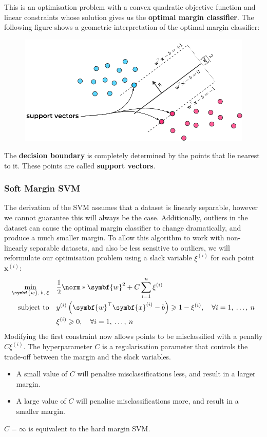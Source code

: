 \documentclass{article}
\begin{document}
This is an optimisation problem with a convex quadratic objective
function and linear constraints whose solution gives us the
\textbf{optimal margin classifier}. The following figure shows a
geometric interpretation of the optimal margin classifier:
\begin{figure}[H]
    \centering
    \includegraphics[width = \linewidth]{figures/hard_margin_svm.pdf}
\end{figure}
The \textbf{decision boundary} is completely determined by the points
that lie nearest to it. These points are called \textbf{support vectors}.
\subsubsection{Soft Margin SVM}
The derivation of the SVM assumes that a dataset is linearly separable,
however we cannot guarantee this will always be the case. Additionally,
outliers in the dataset can cause the optimal margin classifier to
change dramatically, and produce a much smaller margin. To allow this
algorithm to work with non-linearly separable datasets, and also be
less sensitive to outliers, we will reformulate our optimisation
problem using a slack variable \(\xi^{\left( i \right)}\) for each
point \(\symbf{x}^{\left( i \right)}\):
\begin{align*}
    \min_{\symbf{w},\: b,\: \xi} \quad & \frac{1}{2}\norm*{\symbf{w}}^2 + C \sum_{i = 1}^n \xi^{\left( i \right)}                                                                                     \\
    \text{subject to} \quad             & y^{\left( i \right)} \left( \symbf{w}^\top \symbf{x}^{\left( i \right)} - b \right) \geqslant 1 - \xi^{\left( i \right)}, \quad \forall i = 1,\: \dots,\: n \\
                                        & \xi^{\left( i \right)} \geqslant 0, \quad \forall i = 1,\: \dots,\: n
\end{align*}
Modifying the first constraint now allows points to be misclassified
with a penalty \(C \xi^{\left( i \right)}\). The hyperparameter \(C\) is
a regularisation parameter that controls the trade-off between the
margin and the slack variables.
\begin{itemize}
    \item A small value of \(C\) will penalise misclassifications less,
         and result in a larger margin.
    \item A large value of \(C\) will penalise misclassifications more,
         and result in a smaller margin.
\end{itemize}
\(C = \infty\) is equivalent to the hard margin SVM.
\end{document}

